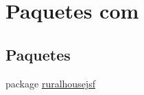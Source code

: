 \hypertarget{namespacecom}{}\section{Paquetes com}
\label{namespacecom}
\subsection*{Paquetes}
\begin{DoxyCompactItemize}
\item 
package \mbox{\hyperlink{namespacecom_1_1ruralhousejsf}{ruralhousejsf}}
\end{DoxyCompactItemize}
